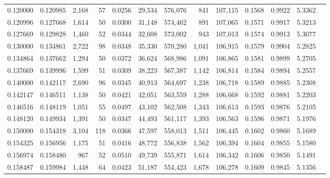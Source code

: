 \begin{tabular}{rrrrrrrrrrrrr}
0.120000 & 0.120985 & 2,168 &  57 &                                     0.0256 &  29,534 & 576,076 &     841 & 107,115 & 0.1568 & 0.9922 & 5.3362 \\
0.120996 & 0.127668 & 1,614 &  50 &                                     0.0300 &  31,148 & 574,462 &     891 & 107,065 & 0.1571 & 0.9917 & 5.3213 \\
0.127669 & 0.129828 & 1,460 &  52 &                                     0.0344 &  32,608 & 573,002 &     943 & 107,013 & 0.1574 & 0.9913 & 5.3077 \\
0.130000 & 0.134861 & 2,722 &  98 &                                     0.0348 &  35,330 & 570,280 &   1,041 & 106,915 & 0.1579 & 0.9904 & 5.2825 \\
0.134864 & 0.137662 & 1,294 &  50 &                                     0.0372 &  36,624 & 568,986 &   1,091 & 106,865 & 0.1581 & 0.9899 & 5.2705 \\
0.137669 & 0.139996 & 1,599 &  51 &                                     0.0309 &  38,223 & 567,387 &   1,142 & 106,814 & 0.1584 & 0.9894 & 5.2557 \\
0.140000 & 0.142117 & 2,690 &  96 &                                     0.0345 &  40,913 & 564,697 &   1,238 & 106,718 & 0.1589 & 0.9885 & 5.2308 \\
0.142147 & 0.146511 & 1,138 &  50 &                                     0.0421 &  42,051 & 563,559 &   1,288 & 106,668 & 0.1592 & 0.9881 & 5.2203 \\
0.146516 & 0.148119 & 1,051 &  55 &                                     0.0497 &  43,102 & 562,508 &   1,343 & 106,613 & 0.1593 & 0.9876 & 5.2105 \\
0.148120 & 0.149934 & 1,391 &  50 &                                     0.0347 &  44,493 & 561,117 &   1,393 & 106,563 & 0.1596 & 0.9871 & 5.1976 \\
0.150000 & 0.154318 & 3,104 & 118 &                                     0.0366 &  47,597 & 558,013 &   1,511 & 106,445 & 0.1602 & 0.9860 & 5.1689 \\
0.154325 & 0.156956 & 1,175 &  51 &                                     0.0416 &  48,772 & 556,838 &   1,562 & 106,394 & 0.1604 & 0.9855 & 5.1580 \\
0.156974 & 0.158480 &   967 &  52 &                                     0.0510 &  49,739 & 555,871 &   1,614 & 106,342 & 0.1606 & 0.9850 & 5.1491 \\
0.158487 & 0.159984 & 1,448 &  64 &                                     0.0423 &  51,187 & 554,423 &   1,678 & 106,278 & 0.1609 & 0.9845 & 5.1356 \\

\end{tabular}
